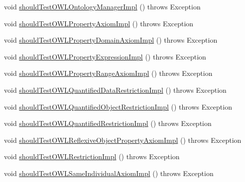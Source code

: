 \begin{DoxyCompactItemize}
\item 
void \hyperlink{classorg_1_1semanticweb_1_1owlapi_1_1contract_1_1_contract_owlapi__3_test_ad471f2b139cd9e009e05b06a2f4c96dc}{should\-Test\-O\-W\-L\-Ontology\-Manager\-Impl} ()  throws Exception 
\item 
void \hyperlink{classorg_1_1semanticweb_1_1owlapi_1_1contract_1_1_contract_owlapi__3_test_a92cb79ae5607de25372b9bbb78f73f93}{should\-Test\-O\-W\-L\-Property\-Axiom\-Impl} ()  throws Exception 
\item 
void \hyperlink{classorg_1_1semanticweb_1_1owlapi_1_1contract_1_1_contract_owlapi__3_test_a04d2bf34ea01e0928c61bb2e33fb07ff}{should\-Test\-O\-W\-L\-Property\-Domain\-Axiom\-Impl} ()  throws Exception 
\item 
void \hyperlink{classorg_1_1semanticweb_1_1owlapi_1_1contract_1_1_contract_owlapi__3_test_a707692efb0c7a38da49a450210e5ed64}{should\-Test\-O\-W\-L\-Property\-Expression\-Impl} ()  throws Exception 
\item 
void \hyperlink{classorg_1_1semanticweb_1_1owlapi_1_1contract_1_1_contract_owlapi__3_test_a1ae9139144c550df69c990eef317a2ec}{should\-Test\-O\-W\-L\-Property\-Range\-Axiom\-Impl} ()  throws Exception 
\item 
void \hyperlink{classorg_1_1semanticweb_1_1owlapi_1_1contract_1_1_contract_owlapi__3_test_aeca4e0d4c019daf9e386b83072a0cb27}{should\-Test\-O\-W\-L\-Quantified\-Data\-Restriction\-Impl} ()  throws Exception 
\item 
void \hyperlink{classorg_1_1semanticweb_1_1owlapi_1_1contract_1_1_contract_owlapi__3_test_af5e2d8acd469d3a6398527827eac7779}{should\-Test\-O\-W\-L\-Quantified\-Object\-Restriction\-Impl} ()  throws Exception 
\item 
void \hyperlink{classorg_1_1semanticweb_1_1owlapi_1_1contract_1_1_contract_owlapi__3_test_a4aebe35ab4076cc9e852e4472f9170f8}{should\-Test\-O\-W\-L\-Quantified\-Restriction\-Impl} ()  throws Exception 
\item 
void \hyperlink{classorg_1_1semanticweb_1_1owlapi_1_1contract_1_1_contract_owlapi__3_test_afee483caab1ea6df2d104dcf88161e21}{should\-Test\-O\-W\-L\-Reflexive\-Object\-Property\-Axiom\-Impl} ()  throws Exception 
\item 
void \hyperlink{classorg_1_1semanticweb_1_1owlapi_1_1contract_1_1_contract_owlapi__3_test_a9c156c1420b56e25ce0f510b45b2c83e}{should\-Test\-O\-W\-L\-Restriction\-Impl} ()  throws Exception 
\item 
void \hyperlink{classorg_1_1semanticweb_1_1owlapi_1_1contract_1_1_contract_owlapi__3_test_aa0d9deb311354270bf54054f0d7724d1}{should\-Test\-O\-W\-L\-Same\-Individual\-Axiom\-Impl} ()  throws Exception 

\end{DoxyCompactItemize}
